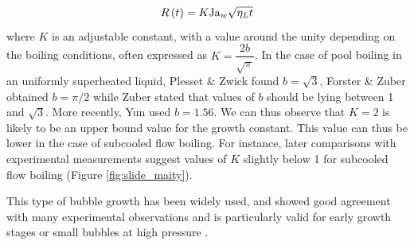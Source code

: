 \begin{equation}
R\left( t \right) = K\mathrm{Ja}_{w} \sqrt{\eta_{L}t}
\end{equation}
where $K$ is an adjustable constant, with a value around the unity depending on the boiling conditions, often expressed as $K=\dfrac{2b}{\sqrt{\pi}}$.  In the case of pool boiling in an uniformly superheated liquid, Plesset \& Zwick \cite{plesset_growth_1954} found $b=\sqrt{3}$, Forster \& Zuber \cite{forster_growth_1954} obtained $b=\pi / 2$ while Zuber  \cite{zuber_dynamics_1961} stated that values of $b$ should be lying between 1 and $\sqrt{3}$. More recently, Yun \etal \cite{yun_prediction_2012} used $b=1.56$. We can thus observe that $K=2$ is likely to be an upper bound value for the growth constant. This value can thus be lower in the case of subcooled flow boiling. For instance, later comparisons with experimental measurements suggest values of $K$ slightly below 1 for subcooled flow boiling (Figure \ref{fig:slide_maity}).

This type of bubble growth has been widely used, and showed good agreement with many experimental observations and is particularly valid for early growth stages or small bubbles at high pressure \cite{kossolapov_experimental_2021, plesset_growth_1954, klausner_vapor_1993}.




\begin{table}[h!]


\noindent{}


\caption{Bubble growth time data in vertical flow boiling}
\label{tab:tg_exp_data}


\end{table}

